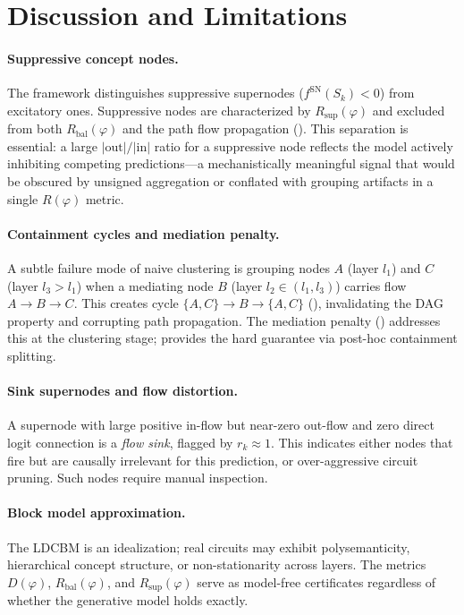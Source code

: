 \documentclass[11pt]{article}
\newcommand{\1}{\mathbbm{1}}
\newcommand{\Rbal}{R_{\mathrm{bal}}(\varphi)}
\newcommand{\Rsup}{R_{\mathrm{sup}}(\varphi)}
\begin{document}
\section{Discussion and Limitations}
\label{sec:discussion}

\paragraph{Suppressive concept nodes.}
The framework distinguishes suppressive supernodes ($f^{\mathrm{SN}}(S_k) < 0$) from excitatory ones.
Suppressive nodes are characterized by $\Rsup$ and excluded from both $\Rbal$ and the path flow propagation ().
This separation is essential: a large $|\mathrm{out}|/|\mathrm{in}|$ ratio for a suppressive node reflects the model actively inhibiting competing predictions---a mechanistically meaningful signal that would be obscured by unsigned aggregation or conflated with grouping artifacts in a single $R(\varphi)$ metric.

\paragraph{Containment cycles and mediation penalty.}
A subtle failure mode of naive clustering is grouping nodes $A$ (layer $l_1$) and $C$ (layer $l_3 > l_1$) when a mediating node $B$ (layer $l_2 \in (l_1, l_3)$) carries flow $A \to B \to C$.
This creates cycle $\{A,C\} \to B \to \{A,C\}$ (), invalidating the DAG property and corrupting path propagation.
The mediation penalty () addresses this at the clustering stage;  provides the hard guarantee via post-hoc containment splitting.

\paragraph{Sink supernodes and flow distortion.}
A supernode with large positive in-flow but near-zero out-flow and zero direct logit connection is a \emph{flow sink}, flagged by $r_k \approx 1$.
This indicates either nodes that fire but are causally irrelevant for this prediction, or over-aggressive circuit pruning.
Such nodes require manual inspection.

\paragraph{Block model approximation.}
The LDCBM is an idealization; real circuits may exhibit polysemanticity, hierarchical concept structure, or non-stationarity across layers.
The metrics $D(\varphi)$, $\Rbal$, and $\Rsup$ serve as model-free certificates regardless of whether the generative model holds exactly.
\end{document}
